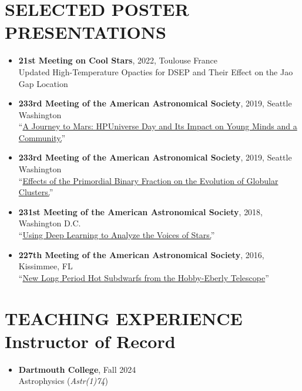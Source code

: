 \documentclass[margin, 10pt]{res} %
\begin{document}
\begin{resume}
\section{SELECTED POSTER\\PRESENTATIONS}
\begin{itemize}
	\item {\scriptsize \textbf{21st Meeting on Cool Stars}}, {\small 2022, Toulouse France}\\Updated High-Temperature Opacties for DSEP and Their Effect on the Jao Gap Location
	\item {\scriptsize \textbf{233rd Meeting of the American Astronomical Society}}, {\small 2019, Seattle Washington}\\ ``\href{https://ui.adsabs.harvard.edu/#abs/2019AAS...23314705C/abstract}{A Journey to Mars: HPUniverse Day and Its Impact on Young Minds and a Community.}''
	\item {\scriptsize \textbf{233rd Meeting of the American Astronomical Society}}, {\small 2019, Seattle Washington}\\ ``\href{https://ui.adsabs.harvard.edu/#abs/2019AAS...23324909B/abstract}{Effects of the Primordial Binary Fraction on the Evolution of Globular Clusters.}''
	\item \textbf{{\scriptsize 231st Meeting of the American Astronomical Society}}, {\small 2018, Washington D.C.}\\``\href{https://ui.adsabs.harvard.edu/#abs/2018AAS...23115029B/abstract}{Using Deep Learning to Analyze the Voices of Stars.}''
	\item \textbf{{\scriptsize 227th Meeting of the American Astronomical Society}}, {\small 2016, Kissimmee, FL}\\``\href{https://ui.adsabs.harvard.edu/#abs/2016AAS...22734412B/abstract}{New Long Period Hot Subdwarfs from the Hobby-Eberly Telescope}''
\end{itemize}

\section{TEACHING EXPERIENCE\\Instructor of Record}
\begin{itemize}
  \item {\scriptsize \textbf{Dartmouth College}}, {\small Fall 2024} \\ Astrophysics (\textit{Astr(1)74})
\end{itemize}

\end{resume}
\end{document}

